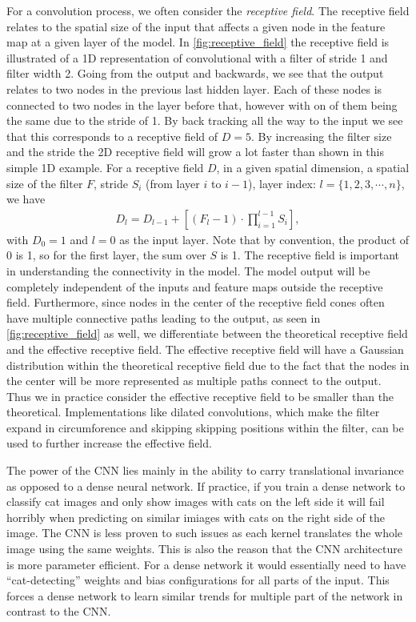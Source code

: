 For a convolution process, we often consider the \textit{receptive field}. The
receptive field relates to the spatial size of the input that affects a given
node in the feature map at a given layer of the model. In
\cref{fig:receptive_field} the receptive field is illustrated of a 1D
representation of convolutional with a filter of stride 1 and filter width 2.
Going from the output and backwards, we see that the output relates to two nodes
in the previous last hidden layer. Each of these nodes is connected to two nodes
in the layer before that, however with on of them being the same due to the
stride of 1. By back tracking all the way to the input we see that this
corresponds to a receptive field of $D = 5$. By increasing the filter size and
the stride the 2D receptive field will grow a lot faster than shown in this
simple 1D example. For a receptive field $D$, in a given spatial dimension, a
spatial size of the filter $F$, stride $S_i$ (from layer $i$ to $i-1$), layer
index: $l = \{1,2,3,\cdots,n\}$, we have
\begin{align*}
    D_l = D_{l-1} + \left[(F_l - 1) \cdot \prod_{i=1}^{l-1}S_i \right],
\end{align*}
with $D_0 = 1$ and $l=0$ as the input layer. Note that by convention, the
product of 0 is 1, so for the first layer, the sum over $S$ is 1. The receptive
field is important in understanding the connectivity in the model. The model
output will be completely independent of the inputs and feature maps outside the
receptive field. Furthermore, since nodes in the center of the receptive field
cones often have multiple connective paths leading to the output, as seen in
\cref{fig:receptive_field} as well, we differentiate between the theoretical
receptive field and the effective receptive field. The effective receptive field
will have a Gaussian distribution within the theoretical receptive field due to
the fact that the nodes in the center will be more represented as multiple paths
connect to the output. Thus we in practice consider the effective receptive
field to be smaller than the theoretical. Implementations like dilated
convolutions, which make the filter expand in circumforence and skipping
skipping positions within the filter, can be used to further increase the
effective field. 

The power of the \acrshort{CNN} lies mainly in the ability to carry
translational invariance as opposed to a dense neural network. If practice, if
you train a dense network to classify cat images and only show images with cats
on the left side it will fail horribly when predicting on similar imiages with
cats on the right side of the image. The \acrshort{CNN} is less proven to such
issues as each kernel translates the whole image using the same weights. This is
also the reason that the \acrshort{CNN} architecture is more parameter
efficient. For a dense network it would essentially need to have
``cat-detecting'' weights and bias configurations for all parts of the input.
This forces a dense network to learn similar trends for multiple part of the
network in contrast to the \acrshort{CNN}.



